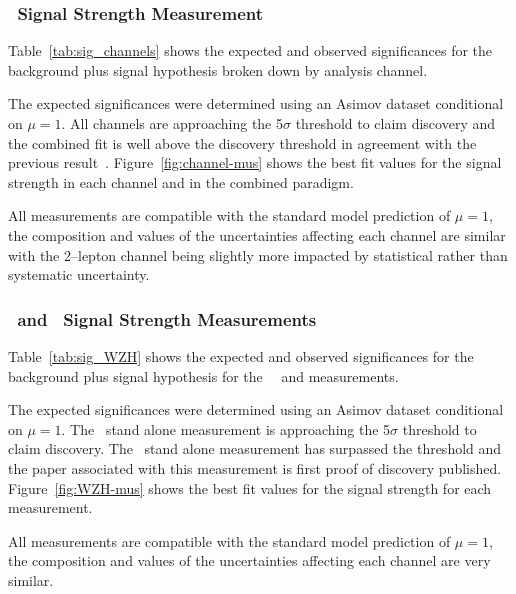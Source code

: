 % 

\subsubsection{\VH\ Signal Strength Measurement}
Table~\ref{tab:sig_channels} shows the expected and observed significances for
the background plus signal hypothesis broken down by analysis channel.

The expected significances were determined using an Asimov dataset conditional
on $\mu=1$. All channels are approaching the 5$\sigma$ threshold to claim
discovery and the combined fit is well above the discovery threshold in
agreement with the previous result~\cite{vhbb-obs}. Figure~\ref{fig:channel-mus}
shows the best fit values for the signal strength in each channel and in the
combined paradigm.

All measurements are compatible with the standard model prediction of $\mu=1$,
the composition and values of the uncertainties affecting each channel are
similar with the 2--lepton channel being slightly more impacted by statistical
rather than systematic uncertainty.
%
\clearpage
\subsubsection{\WH\ and \ZH\ Signal Strength Measurements}
Table~\ref{tab:sig_WZH} shows the expected and observed significances for
the background plus signal hypothesis for the \WH\, \ZH\ and \VH measurements.

The expected significances were determined using an Asimov dataset conditional
on $\mu=1$. The \WH\ stand alone measurement is approaching the 5$\sigma$
threshold to claim discovery. The \ZH\ stand alone measurement has surpassed the
threshold and the paper associated with this measurement is first proof of
discovery published. Figure~\ref{fig:WZH-mus}
shows the best fit values for the signal strength for each measurement.

All measurements are compatible with the standard model prediction of $\mu=1$,
the composition and values of the uncertainties affecting each channel are very
similar.
\clearpage

